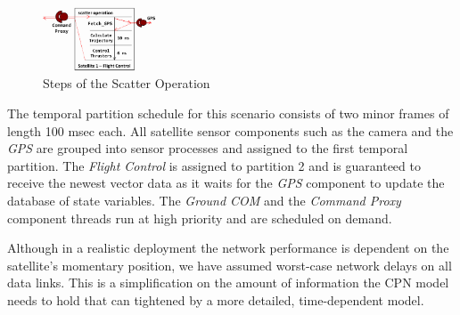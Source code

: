 
\vspace{-0.1in}
\begin{figure}[htb]
	\centering
	\includegraphics[width=0.30\textwidth]{figs/scatter.jpg}
	\caption{Steps of the Scatter Operation}
	\label{fig:FLC}
\end{figure}


The temporal partition schedule for this scenario consists of two minor frames of length 100 msec each. All satellite sensor components such as the camera and the \emph{GPS} are grouped into sensor processes and assigned to the first temporal partition. The \emph{Flight Control} is assigned to partition 2 and is guaranteed to receive the newest vector data as it waits for the \emph{GPS} component to update the database of state variables. The \emph{Ground COM} and the \emph{Command Proxy} component threads run at high priority and are scheduled on demand. 

Although in a realistic deployment the network performance is dependent on the satellite's momentary position, we have assumed worst-case network delays on all data links. This is a simplification on the amount of information the CPN model needs to hold that can tightened by a more detailed, time-dependent model. 

